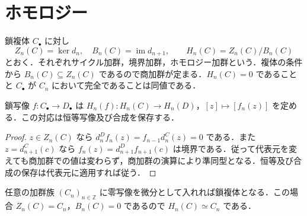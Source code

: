 \section{ホモロジー}
\begin{defn}
鎖複体 $C_\bullet$ に対し
\[
 Z_n(C)=\ker d_n,\quad B_n(C)=\operatorname{im}d_{n+1},
 \qquad H_n(C)=Z_n(C)/B_n(C)
\]
とおく．それぞれサイクル加群，境界加群，ホモロジー加群という．複体の条件から $B_n(C)\subseteq Z_n(C)$ であるので商加群が定まる．$H_n(C)=0$ であることと $C_\bullet$ が $C_n$ において完全であることは同値である．
\end{defn}
\begin{prop}[鎖写像の誘導するホモロジー写像]
鎖写像 $f:C_\bullet\to D_\bullet$ は $H_n(f):H_n(C)\to H_n(D)$，$[z]\mapsto[f_n(z)]$ を定める．この対応は恒等写像及び合成を保存する．
\end{prop}
\begin{proof}
$z\in Z_n(C)$ なら $d_n^Df_n(z)=f_{n-1}d_n^C(z)=0$ である．また $z=d_{n+1}^C(c)$ なら $f_n(z)=d_{n+1}^Df_{n+1}(c)$ は境界である．従って代表元を変えても商加群での値は変わらず，商加群の演算により準同型となる．恒等及び合成の保存は代表元に適用すれば従う．
\end{proof}
\begin{prop}[微分が零の複体]
任意の加群族 $(C_n)_{n\in\mathbb Z}$ に零写像を微分として入れれば鎖複体となる．この場合 $Z_n(C)=C_n$，$B_n(C)=0$ であるので $H_n(C)\simeq C_n$ である．
\end{prop}
